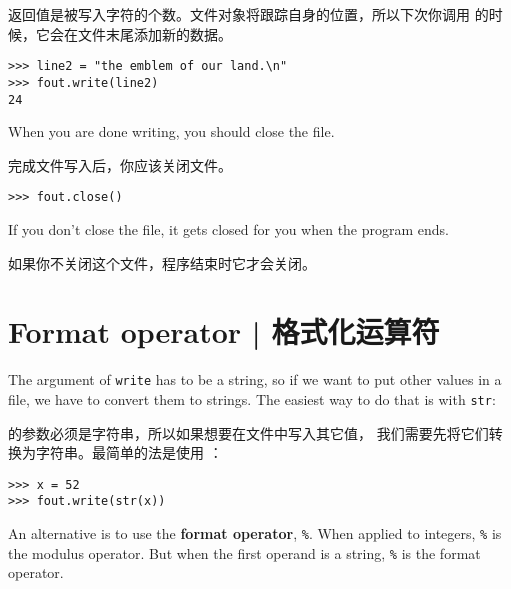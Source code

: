 返回值是被写入字符的个数。文件对象将跟踪自身的位置，所以下次你调用 的时候，它会在文件末尾添加新的数据。

\begin{lstlisting}
>>> line2 = "the emblem of our land.\n"
>>> fout.write(line2)
24
\end{lstlisting}
%
When you are done writing, you should close the file.

完成文件写入后，你应该关闭文件。

\begin{lstlisting}
>>> fout.close()
\end{lstlisting}
%
%
If you don't close the file, it gets closed for you when the
program ends.

如果你不关闭这个文件，程序结束时它才会关闭。

\section{Format operator  |  格式化运算符}
  

The argument of {\tt write} has to be a string, so if we want
to put other values in a file, we have to convert them to
strings.  The easiest way to do that is with {\tt str}:

 的参数必须是字符串，所以如果想要在文件中写入其它值，
我们需要先将它们转换为字符串。最简单的法是使用  ：

\begin{lstlisting}
>>> x = 52
>>> fout.write(str(x))
\end{lstlisting}
%
An alternative is to use the {\bf format operator}, {\tt \%}.  When
applied to integers, {\tt \%} is the modulus operator.  But
when the first operand is a string, {\tt \%} is the format operator.

